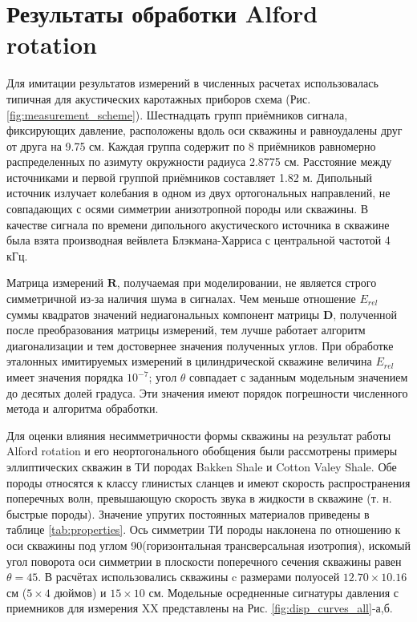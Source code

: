 \documentclass[a4paper,11pt]{article}
\begin{document}
\section{Результаты обработки Alford rotation}
\label{comparison_alford}
Для имитации результатов измерений в численных расчетах использовалась типичная для акустических каротажных приборов схема (Рис. \ref{fig:measurement_scheme}). Шестнадцать групп приёмников сигнала, фиксирующих давление, расположены вдоль оси скважины и равноудалены друг от друга на 9.75 см. Каждая группа содержит по 8 приёмников равномерно распределенных по азимуту окружности радиуса 2.8775 см. Расстояние между источниками и первой группой приёмников составляет 1.82 м. Дипольный источник излучает колебания в одном из двух ортогональных направлений, не совпадающих с осями симметрии анизотропной породы или скважины. В качестве сигнала по времени дипольного акустического источника в скважине была взята производная вейвлета Блэкмана-Харриса с центральной частотой 4 кГц. 

Матрица измерений $\mathbf{R}$, получаемая при моделировании, не является строго симметричной из-за наличия шума в сигналах. Чем меньше отношение $E_{rel}$ суммы квадратов значений недиагональных компонент матрицы $\mathbf{D}$, полученной после преобразования матрицы измерений, тем лучше работает алгоритм диагонализации и тем достовернее значения полученных углов. При обработке эталонных имитируемых измерений в цилиндрической скважине величина $E_{rel}$ имеет значения порядка $10^{-7}$; угол $\theta$ совпадает с заданным модельным значением до десятых долей градуса. Эти значения имеют порядок погрешности численного метода и алгоритма обработки. 

Для оценки влияния несимметричности формы скважины на результат работы Alford rotation и его неортогонального обобщения были рассмотрены примеры эллиптических скважин в ТИ породах  Bakken Shale и Cotton Valey Shale. Обе породы относятся к классу глинистых сланцев и имеют скорость распространения поперечных волн, превышающую скорость звука в жидкости в скважине (т. н. быстрые породы). Значение упругих постоянных материалов приведены в таблице \ref{tab:properties}. Ось симметрии ТИ породы наклонена по отношению к оси скважины под углом 90\textdegree (горизонтальная трансверсальная изотропия), искомый угол поворота оси симметрии в плоскости поперечного сечения скважины равен $\theta = 45$\textdegree. В расчётах использовались скважины c размерами полуосей $12.70 \times 10.16$ см ($5 \times 4$ дюймов) и $15 \times 10$ см. Модельные осредненные сигнатуры давления с приемников для измерения XX представлены на Рис. \ref{fig:disp_curves_all}-а,б.
\end{document}
